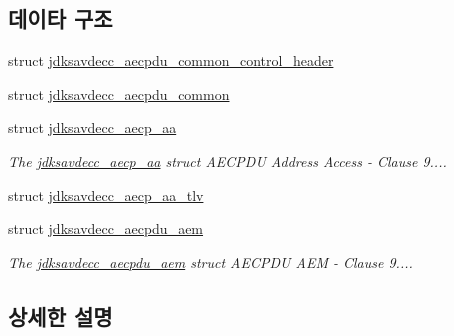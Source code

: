 \subsection*{데이타 구조}
\begin{DoxyCompactItemize}
\item 
struct \hyperlink{structjdksavdecc__aecpdu__common__control__header}{jdksavdecc\+\_\+aecpdu\+\_\+common\+\_\+control\+\_\+header}
\item 
struct \hyperlink{structjdksavdecc__aecpdu__common}{jdksavdecc\+\_\+aecpdu\+\_\+common}
\item 
struct \hyperlink{structjdksavdecc__aecp__aa}{jdksavdecc\+\_\+aecp\+\_\+aa}
\begin{DoxyCompactList}\small\item\em The \hyperlink{structjdksavdecc__aecp__aa}{jdksavdecc\+\_\+aecp\+\_\+aa} struct A\+E\+C\+P\+DU Address Access -\/ Clause 9.... \end{DoxyCompactList}\item 
struct \hyperlink{structjdksavdecc__aecp__aa__tlv}{jdksavdecc\+\_\+aecp\+\_\+aa\+\_\+tlv}
\item 
struct \hyperlink{structjdksavdecc__aecpdu__aem}{jdksavdecc\+\_\+aecpdu\+\_\+aem}
\begin{DoxyCompactList}\small\item\em The \hyperlink{structjdksavdecc__aecpdu__aem}{jdksavdecc\+\_\+aecpdu\+\_\+aem} struct A\+E\+C\+P\+DU A\+EM -\/ Clause 9.... \end{DoxyCompactList}\end{DoxyCompactItemize}


\subsection{상세한 설명}
